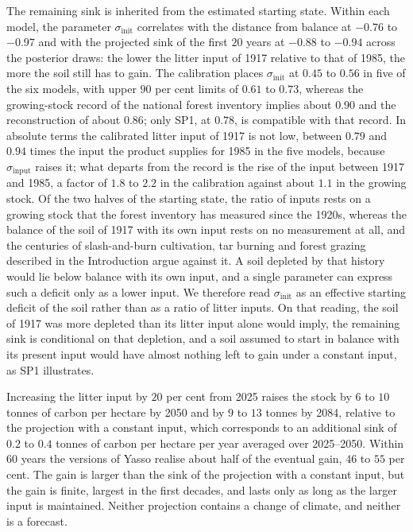 \documentclass[11pt]{article}
\begin{document}
The remaining sink is inherited from the estimated starting state. Within each model,
the parameter $\sigma_{\mathrm{init}}$ correlates with the distance from balance at
$-0.76$ to $-0.97$ and with the projected sink of the first $20$ years at $-0.88$ to
$-0.94$ across the posterior draws: the lower the litter input of 1917 relative to that
of 1985, the more the soil still has to gain. The calibration places
$\sigma_{\mathrm{init}}$ at $0.45$ to $0.56$ in five of the six models, with upper $90$ per
cent limits of $0.61$ to $0.73$, whereas the growing-stock record of the national forest
inventory implies about $0.90$ and the reconstruction of \citet{Liski2006} about $0.86$;
only SP1, at $0.78$, is compatible with that record. In absolute terms the calibrated
litter input of 1917 is not low, between $0.79$ and $0.94$ times the input the product
supplies for 1985 in the five models, because $\sigma_{\mathrm{input}}$ raises it; what
departs from the record is the rise of the input between 1917 and 1985, a factor of $1.8$
to $2.2$ in the calibration against about $1.1$ in the growing stock. Of the two halves
of the starting state, the ratio of inputs rests on a growing stock that the forest
inventory has measured since the 1920s, whereas the balance of the soil of 1917 with its
own input rests on no measurement at all, and the centuries of slash-and-burn
cultivation, tar burning and forest grazing described in the Introduction argue against
it. A soil depleted by that history would lie below balance with its own
input, and a single parameter can express such a deficit only as a lower input. We
therefore read $\sigma_{\mathrm{init}}$ as an effective starting deficit of the soil
rather than as a ratio of litter inputs. On that reading, the soil of 1917 was more
depleted than its litter input alone would imply, the remaining sink is conditional on
that depletion, and a soil assumed to start in balance with its present input would have
almost nothing left to gain under a constant input, as SP1 illustrates.

Increasing the litter input by $20$ per cent from 2025 raises the stock by $6$ to $10$
tonnes of carbon per hectare by 2050 and by $9$ to $13$ tonnes by 2084, relative to the
projection with a constant input, which corresponds to an additional sink of $0.2$ to
$0.4$ tonnes of carbon per hectare per year averaged over 2025--2050. Within $60$ years
the versions of Yasso realise about half of the eventual gain, $46$ to $55$ per cent. The
gain is larger than the sink of the projection with a constant input, but the gain is
finite, largest in the first decades, and lasts only as long as the larger input is
maintained. Neither projection contains a change of climate, and neither is a forecast.
\end{document}
